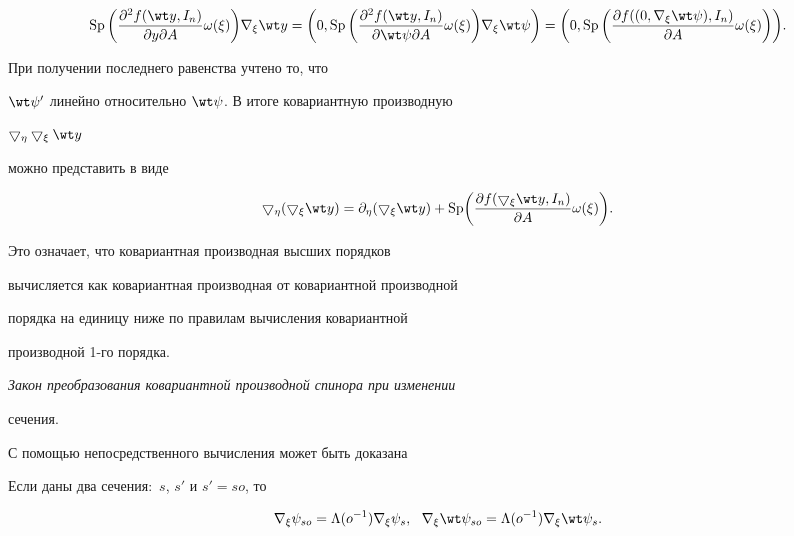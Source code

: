 $$


\SP\bigg( \frac{\partial^2f(\wt y,I_n)}


{\partial y\partial A} \omega(\xi) \bigg)\nabla_\xi\wt y=


\bigg(0,\SP\bigg( \frac{\partial^2f(\wt y,I_n)}


{\partial \wt\psi\partial A} \omega(\xi) \bigg)\nabla_\xi\wt\psi\bigg)=


\bigg(0,\SP\bigg( \frac{\partial f((0,\nabla_\xi\wt\psi),I_n)}


{\partial A} \omega(\xi) \bigg)\bigg).


$$


При получении последнего равенства учтено то, что


$\wt\psi'$ линейно относительно $\wt\psi$. В итоге ковариантную производную


$\bigtriangledown_\eta \bigtriangledown_\xi \wt y$


можно представить в виде


$$


\bigtriangledown_\eta( \bigtriangledown_\xi \wt y)=


\partial_\eta(\bigtriangledown_\xi \wt y)+


\SP\biggl( \frac{\partial f(\bigtriangledown_\xi\wt y,I_n)


}{\partial A} \omega(\xi) \biggr).


$$


Это означает, что ковариантная производная высших порядков


вычисляется как ковариантная производная от ковариантной производной


порядка на единицу ниже по правилам вычисления ковариантной


производной 1-го порядка.





{\it Закон преобразования ковариантной производной спинора при изменении


сечения.}


С помощью непосредственного вычисления может быть доказана





\begin{thm}


Если даны два сечения\/${:}$ $s$, $s'$ и $s'=so$, то


$$


\nabla_\xi\psi_{so}=\Lambda(o^{-1})\nabla_\xi\psi_{s},


\ \ \nabla_\xi\wt\psi_{so}=


\Lambda(o^{-1})\nabla_\xi\wt\psi_{s}.


$$


\end{thm}





